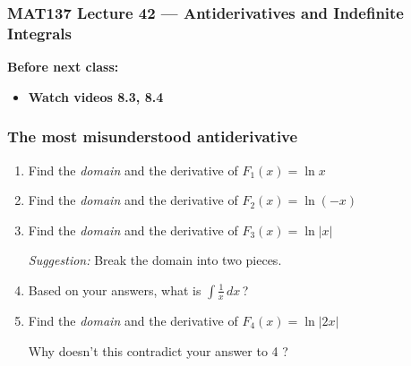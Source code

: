\documentclass[14pt]{beamer}
\date{}
\title{}
\author{}
\newcommand{\p}{\pause}
\newcommand{\azul}[1]{{\color{blue} #1}}
\newcommand{\setsize}[1]{\fontsize{#1}{#1}\selectfont} %
\newcommand{\smallerfont}{\setsize{13}} %
\newcommand{\vv}{\vspace{.1cm}}
\begin{document}
\begin{frame}
	\frametitle{MAT137 Lecture 42 --- Antiderivatives and Indefinite Integrals}

	\vfill
	{\bf Before next class:}
		\begin{itemize} \normalsize
			\item {\bf Watch videos 8.3, 8.4}
		\end{itemize}
\end{frame}
	\begin{frame}[t]
		\smallerfont
		\frametitle{The most misunderstood antiderivative}
		\begin{enumerate}
			\item Find the \emph{domain} and the derivative of \;
				${\displaystyle F_1(x) = \ln x}$ \vv

			\item Find the \emph{domain} and the derivative of \;
				${\displaystyle F_2(x) = \ln (-x)}$ \vv

			\item Find the \emph{domain} and the derivative of \;
				${\displaystyle F_3(x) = \ln |x|}$ \vv

				\emph{Suggestion:} Break the domain into two pieces. \vv \p

			\item \label{qu:ln} Based on your answers, what is
				${\displaystyle \int \frac{1}{x} \,dx \,}$? \vv \p

			\item Find the \emph{domain} and the derivative of \;
				${\displaystyle F_4(x) = \ln |2x|}$ \vv

				Why doesn't this contradict your answer to \azul{4} ?
		\end{enumerate}
	\end{frame}
\end{document}
